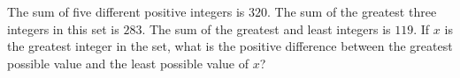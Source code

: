 The sum of five different positive integers is \(320\). The sum of the greatest three integers in this set is \(283\). The sum of the greatest and least integers is \(119\). If \(x\) is the greatest integer in the set, what is the positive difference between the greatest possible value and the least possible value of \(x\)?
